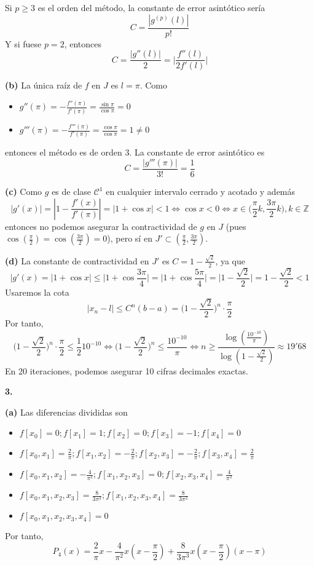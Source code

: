 \documentclass[12pt]{report}
\newcommand{\Z}{\mathbb Z}
\begin{document}
\vspace{2mm}
Si $p \geq 3$ es el orden del método, la constante de error asintótico sería
\[C = \frac{|g^{(p)}(l)|}{p!}\]
Y si fuese $p = 2$, entonces
\[C = \frac{|g''(l)|}{2} = \Biggl|\frac{f''(l)}{2f'(l)} \Biggr|\]

\vspace{2mm}
\textbf{(b)} La única raíz de $f$ en $J$ es $l = \pi$. Como 
\begin{itemize}
    \item $\displaystyle g''(\pi) = -\frac{f''(\pi)}{f'(\pi)} = \frac{\sin{\pi}}{\cos{\pi}} = 0$
    \item $\displaystyle g'''(\pi) = -\frac{f'''(\pi)}{f'(\pi)} = \frac{\cos{\pi}}{\cos{\pi}} = 1 \neq 0$
\end{itemize}
entonces el método es de orden $3$. La constante de error asintótico es
\[C = \frac{|g'''(\pi)|}{3!} = \frac{1}{6}\]

\vspace{2mm}
\textbf{(c)} Como $g$ es de clase $\mathcal{C}^1$ en cualquier intervalo cerrado y acotado y además
\[|g'(x)| = |1 - \frac{f'(x)}{f'(\pi)}| = |1 + \cos{x}| < 1 \iff \cos{x} < 0 \iff x \in \biggl(\frac{\pi}{2}k, \frac{3\pi}{2}k \biggr), k \in \Z\]
entonces no podemos asegurar la contractividad de $g$ en $J$ (pues $\cos(\frac{\pi}{2}) = \cos(\frac{3\pi}{2}) = 0$), pero sí en $J' \subset (\frac{\pi}{2},\frac{3\pi}{2})$.

\vspace{2mm}
\textbf{(d) } La constante de contractividad en $J'$ es $C = 1 - \frac{\sqrt{2}}{2}$, ya que
\[|g'(x) = |1+\cos{x}| \leq |1 + \cos{\frac{3\pi}{4}}| = |1 + \cos{\frac{5\pi}{4}}| = |1 - \frac{\sqrt{2}}{2}| = 1 - \frac{\sqrt{2}}{2} < 1\]
Usaremos la cota
\[|x_n - l| \leq C^n(b-a) = \biggl(1-\frac{\sqrt{2}}{2} \biggr)^n \cdot \frac{\pi}{2}\]
Por tanto,
\[\biggl(1-\frac{\sqrt{2}}{2} \biggr)^n \cdot \frac{\pi}{2} \leq \frac{1}{2}10^{-10} \iff \biggl(1-\frac{\sqrt{2}}{2} \biggr)^n \leq \frac{10^{-10}}{\pi} \iff n \geq \frac{\log(\frac{10^{-10}}{\pi})}{\log({1-\frac{\sqrt{2}}{2}})} \approx 19'68\]
En 20 iteraciones, podemos asegurar 10 cifras decimales exactas.

\vspace{2mm}
\textbf{3. } 

\vspace{2mm}
\textbf{(a) } Las diferencias divididas son
\begin{itemize}
    \item $f[x_0] = 0; f[x_1] = 1; f[x_2] = 0; f[x_3] = -1; f[x_4] = 0$
    \item $\displaystyle f[x_0,x_1] = \frac{2}{\pi}; f[x_1,x_2] = -\frac{2}{\pi}; f[x_2,x_3] = -\frac{2}{\pi}; f[x_3,x_4] = \frac{2}{\pi}$
    \item $\displaystyle f[x_0,x_1,x_2] = -\frac{4}{\pi^2}; f[x_1,x_2,x_3] = 0; f[x_2,x_3,x_4] = \frac{4}{\pi^2}$
    \item $\displaystyle f[x_0,x_1,x_2,x_3] = \frac{8}{3\pi^3}; f[x_1,x_2,x_3,x_4] = \frac{8}{3\pi^3}$
    \item $\displaystyle f[x_0,x_1,x_2,x_3,x_4] = 0$
\end{itemize}
Por tanto,
\[P_4(x) = \frac{2}{\pi}x - \frac{4}{\pi^2}x(x-\frac{\pi}{2}) + \frac{8}{3\pi^3}x(x-\frac{\pi}{2})(x-\pi)\]
\end{document}
